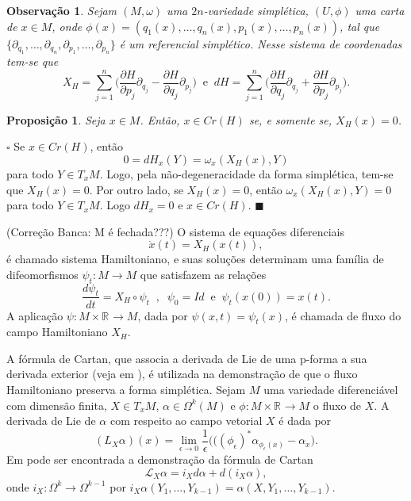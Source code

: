 \documentclass[12pt]{book}
\newtheorem{observacao}[teorema]{Observação}
\newtheorem{proposicao}[teorema]{Proposição}
\newenvironment{prova}[1]{$\square$ #1}{\hfill$\blacksquare$}
\newcommand{\campohamiltoniano}[1]{X_{H}(#1)}
\newcommand{\campohamiltonianoabrev}{X_{H}}
\newcommand{\derivada}[2]{\frac{d #1}{d #2}}
\newcommand{\derivadaparcial}[2]{\frac{\partial #1}{\partial #2}}
\newcommand{\liederivada}[1]{\mathcal{L}_{#1}}
\newcommand{\pontoscriticos}[1]{\textit{Cr}(#1)}
\newcommand{\real}[1]{\mathbb{R}^{#1}}
\newcommand{\reta}{\real{}}
\newcommand{\alerta}[1]{{\color{red}#1}}
\newcommand{\correcaobanca}[1]{\alerta{(Correção Banca: #1)}}
\begin{document}
	\begin{observacao}
		Sejam $(M, \omega)$ uma $2n$-variedade simplética, $(U, \phi)$ uma carta de $x\in M$, onde $\phi(x)=(q_{1}(x), \dots, q_{n}(x), p_{1}(x), \dots, p_{n}(x))$, tal que $\{\partial_{q_{1}}, \dots , \partial_{q_{n}}, \partial_{p_{1}}, \dots, \partial_{p_{n}} \}$ é um referencial simplético. Nesse sistema de coordenadas tem-se que 
		$$
		\campohamiltonianoabrev = \sum_{j=1}^{n}\Big(\derivadaparcial{H}{p_{j}}\partial_{q_{j}}  - \derivadaparcial{H}{q_{j}}\partial_{p_{j}}  \Big)\;\;\text{e}\;\; dH =  \sum_{j=1}^{n}\Big(\derivadaparcial{H}{q_{j}}\partial_{q_{j}}  + \derivadaparcial{H}{p_{j}}\partial_{p_{j}}  \Big).
		$$
	\end{observacao}
	
	\begin{proposicao}
		Seja $x\in M$. Então, $x\in \pontoscriticos{H}$ se, e somente se, $\campohamiltoniano{x}=0$.
	\end{proposicao}
	\begin{prova}
		Se $x\in \pontoscriticos{H}$, então 
		$$
		0=dH_{x}(Y)=\omega_{x}(\campohamiltonianoabrev(x), Y)
		$$
		para todo $Y\in T_{x}M$. Logo, pela não-degeneracidade da forma simplética, tem-se que $\campohamiltoniano{x} =0$. Por outro lado, se $\campohamiltoniano{x} =0$, então $\omega_{x}(\campohamiltonianoabrev(x), Y)=0$ para todo $Y\in T_{x}M$. Logo $dH_{x}=0$ e $x\in \pontoscriticos{H}$.
	\end{prova}
	
	\correcaobanca{M é fechada???}
	O sistema de equações diferenciais
	$$
		\dot{x}(t)=\campohamiltoniano{x(t)},
	$$
	é chamado sistema Hamiltoniano, e suas soluções determinam uma família de difeomorfismos $\psi_{t}:M\to M$ que satisfazem as relações 
	$$
	\derivada{\psi_{t}}{t}=\campohamiltonianoabrev\circ\psi_{t} \;\;, \;\; \psi_{0}=Id \;\;\text{e}\;\;  \psi_{t}(x(0)) = x(t).
	$$
	A aplicação $\psi: M\times \reta \to M$, dada por $\psi(x,t)=\psi_{t}(x)$, é chamada de fluxo do campo Hamiltoniano $\campohamiltonianoabrev$.
	
	A fórmula de Cartan, que associa a derivada de Lie de uma p-forma a sua derivada exterior (veja em \cite{nakahara}), é utilizada na demonstração de que o fluxo Hamiltoniano preserva a forma simplética. Sejam $M$ uma variedade diferenciável com dimensão finita, $X \in T_{x}M$, $\alpha \in \Omega^{k}(M)$ e $\phi:M\times \reta \to M$ o fluxo de $X$. A derivada de Lie de $\alpha$ com respeito ao campo vetorial $X$ é dada por
	$$
	(L_{X}\alpha)(x)=\lim\limits_{\epsilon\to 0} \frac{1}{\epsilon}\big( ((\phi_{\epsilon})^{*}\alpha_{\phi_{\epsilon}(x)} - \alpha_{x} \big).
	$$
	Em \cite{nakahara} pode ser encontrada a demonstração da fórmula de Cartan	
	$$
	\liederivada{X}\alpha = i_{X}d\alpha + d(i_{X}\alpha),
	$$
	onde $i_{X}:\Omega^{k} \to \Omega^{k-1}$ por $i_{X}\alpha(Y_{1}, \dots, Y_{k-1}) = \alpha(X, Y_{1}, \dots, Y_{k-1})$.	
	
\end{document}
